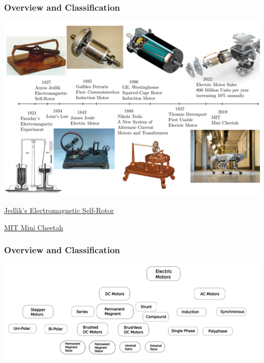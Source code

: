 \documentclass[fleqn]{beamer} %
\newcommand{\sectiontitleI}{Overview and Classification}
\begin{document}
		\begin{frame}[label=sectionI] \small
			\frametitle{\sectiontitleI}	

			\includegraphics[scale=0.25]{images/motor_timeline.png}

			\href{https://en.wikipedia.org/wiki/Electric_motor}{Jedlik's Electromagnetic Self-Rotor}

			\href{https://news.mit.edu/2019/mit-mini-cheetah-first-four-legged-robot-to-backflip-0304}{MIT Mini Cheetah}

		\end{frame}


	

	\begin{frame}[label=sectionI] \small
		\frametitle{\sectiontitleI}	
		
		\includegraphics[scale=0.25]{images/classes_of_motors.png}

	\end{frame}
\end{document}
